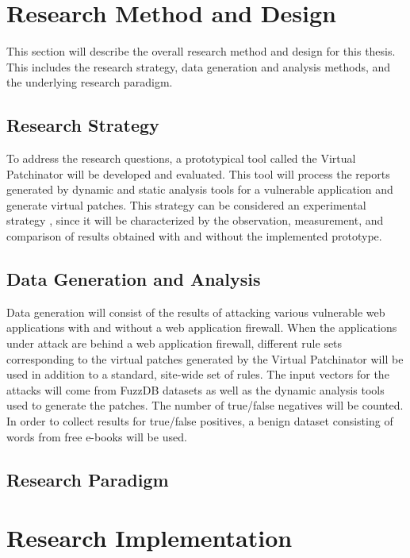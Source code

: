 \section{Research Method and Design} \label{sec:method}
This section will describe the overall research method and design for this thesis. This includes the research strategy, data generation and analysis methods, and the underlying research paradigm.

\subsection{Research Strategy} \label{subsec:strategy}
To address the research questions, a prototypical tool called the Virtual Patchinator will be developed and evaluated. This tool will process the reports generated by dynamic and static analysis tools for a vulnerable application and generate virtual patches. This strategy can be considered an experimental strategy \cite{oates2005researching}, since it will be characterized by the observation, measurement, and comparison of results obtained with and without the implemented prototype.


\subsection{Data Generation and Analysis}\label{subsec:data}
Data generation will consist of the results of attacking various vulnerable web applications with and without a web application firewall. When the applications under attack are behind a web application firewall, different rule sets corresponding to the virtual patches generated by the Virtual Patchinator will be used in addition to a standard, site-wide set of rules. The input vectors for the attacks will come from FuzzDB datasets as well as the dynamic analysis tools used to generate the patches. The number of true/false negatives will be counted. In order to collect results for true/false positives, a benign dataset consisting of words from free e-books will be used. 

\subsection{Research Paradigm}\label{subsec:paradigm}




\section{Research Implementation} \label{sec:implementation}